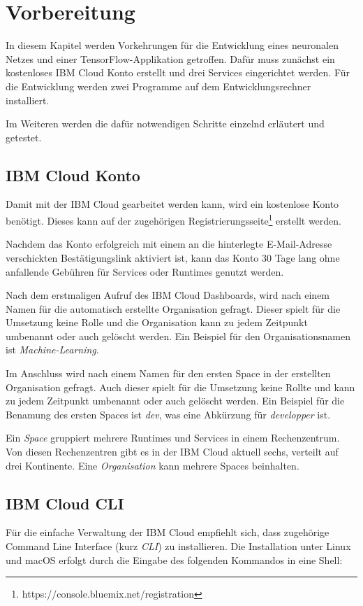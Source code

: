 \section{Vorbereitung}
In diesem Kapitel werden Vorkehrungen für die Entwicklung eines neuronalen Netzes und einer TensorFlow-Applikation
getroffen. Dafür muss zunächst ein kostenloses IBM Cloud Konto erstellt und drei Services eingerichtet werden.
Für die Entwicklung werden zwei Programme auf dem Entwicklungsrechner installiert.

Im Weiteren werden die dafür notwendigen Schritte einzelnd erläutert und getestet.

\subsection{IBM Cloud Konto}
Damit mit der IBM Cloud gearbeitet werden kann, wird ein kostenlose Konto benötigt. Dieses kann auf der zugehörigen
Registrierungsseite\footnote{https://console.bluemix.net/registration} erstellt werden.

Nachdem das Konto erfolgreich mit einem an die hinterlegte E-Mail-Adresse verschickten Bestätigungslink aktiviert ist,
kann das Konto 30 Tage lang ohne anfallende Gebühren für Services oder Runtimes genutzt werden.

Nach dem erstmaligen Aufruf des IBM Cloud Dashboards, wird nach einem Namen für die automatisch erstellte Organisation
gefragt. Dieser spielt für die Umsetzung keine Rolle und die Organisation kann zu jedem Zeitpunkt umbenannt oder auch
gelöscht werden. Ein Beispiel für den Organisationsnamen ist \textit{Machine-Learning}.

Im Anschluss wird nach einem Namen für den ersten Space in der erstellten Organisation gefragt. Auch dieser
spielt für die Umsetzung keine Rollte und kann zu jedem Zeitpunkt umbenannt oder auch gelöscht werden. Ein Beispiel für
die Benamung des ersten Spaces ist \textit{dev}, was eine Abkürzung für \textit{developper} ist.

Ein \textit{Space} gruppiert mehrere Runtimes und Services in einem Rechenzentrum. Von diesen Rechenzentren gibt es in
der IBM Cloud aktuell sechs, verteilt auf drei Kontinente. Eine \textit{Organisation} kann mehrere Spaces beinhalten.

\subsection{IBM Cloud CLI}
Für die einfache Verwaltung der IBM Cloud empfiehlt sich, dass zugehörige Command Line Interface (kurz \textit{CLI}) zu
installieren. Die Installation unter Linux und macOS erfolgt durch die Eingabe des folgenden Kommandos in eine Shell:

